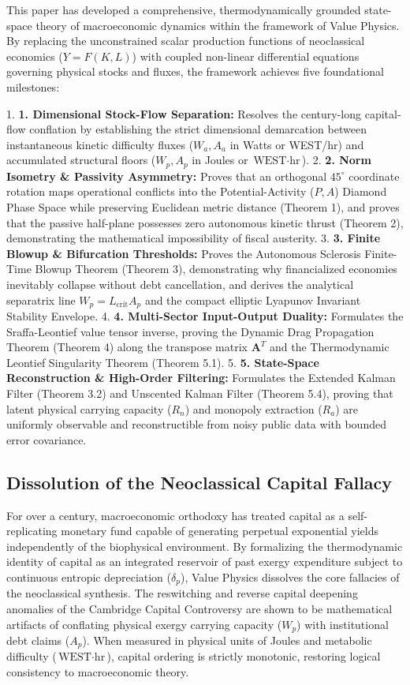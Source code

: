 \documentclass[preprint,12pt,authoryear]{elsarticle}
\theoremstyle{definition}
\begin{document}
This paper has developed a comprehensive, thermodynamically grounded state-space theory of macroeconomic dynamics within the framework of Value Physics. By replacing the unconstrained scalar production functions of neoclassical economics ($Y = F(K, L)$) with coupled non-linear differential equations governing physical stocks and fluxes, the framework achieves five foundational milestones:

1.  \textbf{1. Dimensional Stock-Flow Separation:} Resolves the century-long capital-flow conflation by establishing the strict dimensional demarcation between instantaneous kinetic difficulty fluxes ($W_a, A_a$ in Watts or WEST/hr) and accumulated structural floors ($W_p, A_p$ in Joules or $\text{WEST}\cdot\text{hr}$).
2.  \textbf{2. Norm Isometry \& Passivity Asymmetry:} Proves that an orthogonal $45^\circ$ coordinate rotation maps operational conflicts into the Potential-Activity ($P, A$) Diamond Phase Space while preserving Euclidean metric distance (Theorem 1), and proves that the passive half-plane possesses zero autonomous kinetic thrust (Theorem 2), demonstrating the mathematical impossibility of fiscal austerity.
3.  \textbf{3. Finite Blowup \& Bifurcation Thresholds:} Proves the Autonomous Sclerosis Finite-Time Blowup Theorem (Theorem 3), demonstrating why financialized economies inevitably collapse without debt cancellation, and derives the analytical separatrix line $W_p = L_{\text{crit}} A_p$ and the compact elliptic Lyapunov Invariant Stability Envelope.
4.  \textbf{4. Multi-Sector Input-Output Duality:} Formulates the Sraffa-Leontief value tensor inverse, proving the Dynamic Drag Propagation Theorem (Theorem 4) along the transpose matrix $\mathbf{A}^T$ and the Thermodynamic Leontief Singularity Theorem (Theorem 5.1).
5.  \textbf{5. State-Space Reconstruction \& High-Order Filtering:} Formulates the Extended Kalman Filter (Theorem 3.2) and Unscented Kalman Filter (Theorem 5.4), proving that latent physical carrying capacity ($R_n$) and monopoly extraction ($R_a$) are uniformly observable and reconstructible from noisy public data with bounded error covariance.

\subsection{Dissolution of the Neoclassical Capital Fallacy}

For over a century, macroeconomic orthodoxy has treated capital as a self-replicating monetary fund capable of generating perpetual exponential yields independently of the biophysical environment. By formalizing the thermodynamic identity of capital as an integrated reservoir of past exergy expenditure subject to continuous entropic depreciation ($\delta_p$), Value Physics dissolves the core fallacies of the neoclassical synthesis. The reswitching and reverse capital deepening anomalies of the Cambridge Capital Controversy are shown to be mathematical artifacts of conflating physical exergy carrying capacity ($W_p$) with institutional debt claims ($A_p$). When measured in physical units of Joules and metabolic difficulty ($\text{WEST}\cdot\text{hr}$), capital ordering is strictly monotonic, restoring logical consistency to macroeconomic theory.
\end{document}
